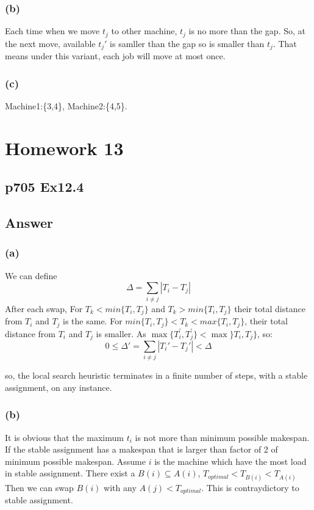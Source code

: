 \documentclass[a4paper]{article}
\begin{document}
\subsubsection*{(b)}
Each time when we move $t_j$ to other machine, $t_j$ is no more than the gap. So, at the next move, available $t_j'$ is samller than the gap so is smaller than $t_j$. That means under this variant, each job will move at most once.

\subsubsection*{(c)}
Machine1:\{3,4\}, Machine2:\{4,5\}.


\newpage
\section*{Homework 13}
\subsection*{p705 Ex12.4}
\subsection*{ Answer}
\subsubsection*{(a)}
We can define
$$
	\Delta = \sum_{i \neq j}|T_i-T_j|
$$
After each swap, For $T_k < min\{T_i,T_j\}$ and $T_k > min\{T_i,T_j\}$ their total distance from $T_i$ and $T_j$ is the same. For $min\{T_i,T_j\} < T_k < max\{T_i,T_j\}$, their total distance from $T_i$ and $T_j$ is smaller. As
$\max \{T_{i}^{\prime}, T_{j}^{\prime}\} < \max\}T_{i}, T_{j}\} $, so:
$$
	0 \leq \Delta' = \sum_{i \neq j}|T_i'-T_j'| < \Delta
$$

so, the local search heuristic terminates in a finite number of steps, with a stable assignment, on any instance.


\subsubsection*{(b)}
It is obvious that the maximum $t_i$ is not more than minimum possible makespan.
If the stable assignment has a makespan that is larger than factor of 2 of minimum possible makespan. Assume $i$ is the machine which have the most load in stable assignment. There exist a $B(i) \subseteq A(i)$, $T_{optimal}<T_{B(i)}<T_{A(i)}$ Then we can swap $B(i)$ with any $A(j)<T_{optimal}$. This is contraydictory to stable assignment.
\vspace*{2cm}
\end{document}
